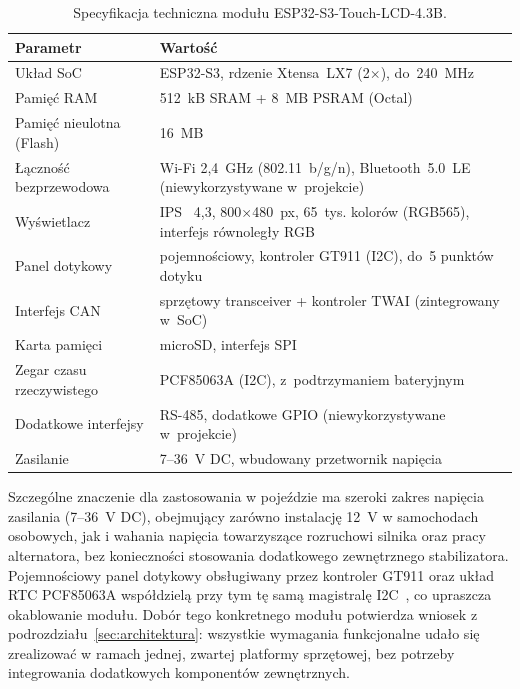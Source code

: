 \begin{table}[!h]
    \centering
    \caption{Specyfikacja techniczna modułu ESP32-S3-Touch-LCD-4.3B.}
    \label{tab:specyfikacja-platforma}
    \begin{tabular}{| p{5.3cm} | p{8.4cm} |} \hline
        \textbf{Parametr} & \textbf{Wartość} \\ \hline\hline
        Układ SoC & ESP32-S3, rdzenie Xtensa~LX7 (2$\times$), do~240~MHz \\ \hline
        Pamięć RAM~\cite{wikiram} & 512~kB SRAM + 8~MB PSRAM (Octal) \\ \hline
        Pamięć nieulotna (Flash) & 16~MB \\ \hline
        Łączność bezprzewodowa & Wi-Fi 2,4~GHz (802.11~b/g/n), Bluetooth~5.0~LE (niewykorzystywane w~projekcie) \\ \hline
        Wyświetlacz & IPS~\cite{wikilcd} 4,3\textquotedbl{}, 800$\times$480~px, 65~tys. kolorów (RGB565), interfejs równoległy RGB \\ \hline
        Panel dotykowy & pojemnościowy, kontroler GT911 (I2C), do~5 punktów dotyku \\ \hline
        Interfejs CAN & sprzętowy transceiver + kontroler TWAI (zintegrowany w~SoC) \\ \hline
        Karta pamięci & microSD, interfejs SPI \\ \hline
        Zegar czasu rzeczywistego & PCF85063A (I2C), z~podtrzymaniem bateryjnym \\ \hline
        Dodatkowe interfejsy & RS-485, dodatkowe GPIO (niewykorzystywane w~projekcie) \\ \hline
        Zasilanie & 7--36~V DC, wbudowany przetwornik napięcia \\ \hline
    \end{tabular}
\end{table}

Szczególne znaczenie dla zastosowania w pojeździe ma szeroki zakres
napięcia zasilania (7--36~V DC), obejmujący zarówno instalację 12~V
w samochodach osobowych, jak i wahania napięcia towarzyszące rozruchowi
silnika oraz pracy alternatora, bez konieczności stosowania dodatkowego
zewnętrznego stabilizatora. Pojemnościowy panel dotykowy obsługiwany przez kontroler GT911 oraz układ RTC
PCF85063A współdzielą przy tym tę samą magistralę I2C~\cite{i2cspec}, co upraszcza
okablowanie modułu. Dobór tego konkretnego modułu potwierdza
wniosek z podrozdziału~\ref{sec:architektura}: wszystkie wymagania funkcjonalne
udało się zrealizować w ramach jednej, zwartej platformy sprzętowej, bez
potrzeby integrowania dodatkowych komponentów zewnętrznych.

